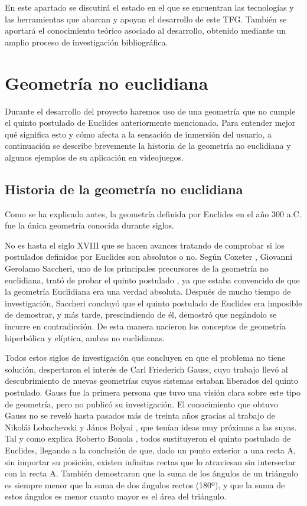 \documentclass[../main.tex]{subfiles}
\begin{document}
En este apartado se discutirá el estado en el que se encuentran las tecnologías y las herramientas que abarcan y apoyan el desarrollo de este TFG. También se aportará el conocimiento teórico asociado al desarrollo, obtenido mediante un amplio proceso de investigación bibliográfica.

\section{Geometría no euclidiana}

Durante el desarrollo del proyecto haremos uso de una geometría que no cumple el quinto postulado de Euclides anteriormente mencionado. Para entender mejor qué significa esto y cómo afecta a la sensación de inmersión del usuario, a continuación se describe brevemente la historia de la geometría no euclidiana y algunos ejemplos de su aplicación en videojuegos.

\subsection{Historia de la geometría no euclidiana}

Como se ha explicado antes, la geometría definida por Euclides en el año 300 a.C. fue la única geometría conocida durante siglos.

No es hasta el siglo XVIII que se hacen avances tratando de comprobar si los postulados definidos por Euclides son absolutos o no. Según Coxeter \cite{Coxeter}, Giovanni Gerolamo Saccheri, uno de los principales precursores de la geometría no euclidiana, trató de probar el quinto postulado \cite{Saccheri_GP}, ya que estaba convencido de que la geometría Euclidiana era una verdad absoluta. Después de mucho tiempo de investigación, Saccheri concluyó que el quinto postulado de Euclides era imposible de demostrar, y más tarde, prescindiendo de él, demostró que negándolo se incurre en contradicción. De esta manera nacieron los conceptos de geometría hiperbólica y elíptica, ambas no euclidianas.

Todos estos siglos de investigación que concluyen en que el problema no tiene solución, despertaron el interés de Carl Friederich Gauss, cuyo trabajo llevó al descubrimiento de nuevas geometrías cuyos sistemas estaban liberados del quinto postulado. Gauss fue la primera persona que tuvo una visión clara sobre este tipo de geometría, pero no publicó su investigación. El conocimiento que obtuvo Gauss no se reveló hasta pasados más de treinta años gracias al trabajo de Nikolái Lobachevski \cite{Lobachevski} y János Bolyai \cite{Bolyai}, que tenían ideas muy próximas a las suyas. Tal y como explica Roberto Bonola \cite{Bonola}, todos sustituyeron el quinto postulado de Euclides, llegando a la conclusión de que, dado un punto exterior a una recta A, sin importar su posición, existen infinitas rectas que lo atraviesan sin intersectar con la recta A. También demostraron que la suma de los ángulos de un triángulo es siempre menor que la suma de dos ángulos rectos (180º), y que la suma de estos ángulos es menor cuanto mayor es el área del triángulo.
\end{document}
